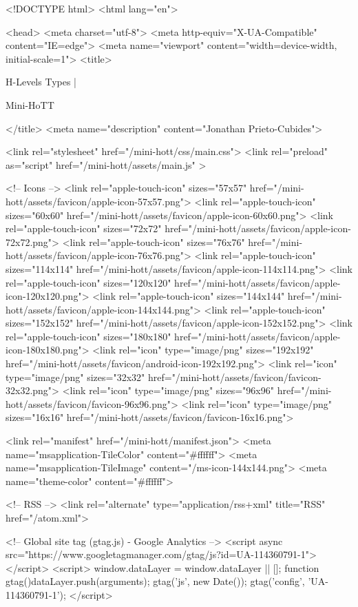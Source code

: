 <!DOCTYPE html>
<html lang="en">

<head>
  <meta charset="utf-8">
  <meta http-equiv="X-UA-Compatible" content="IE=edge">
  <meta name="viewport" content="width=device-width, initial-scale=1">
  <title>
    
      
        H-Levels Types |
      
        Mini-HoTT
    
  </title>
  <meta name="description" content="Jonathan Prieto-Cubides">

  <link rel="stylesheet" href="/mini-hott/css/main.css">
  <link rel="preload" as="script" href="/mini-hott/assets/main.js" >

  <!-- Icons -->
  <link rel="apple-touch-icon" sizes="57x57" href="/mini-hott/assets/favicon/apple-icon-57x57.png">
  <link rel="apple-touch-icon" sizes="60x60" href="/mini-hott/assets/favicon/apple-icon-60x60.png">
  <link rel="apple-touch-icon" sizes="72x72" href="/mini-hott/assets/favicon/apple-icon-72x72.png">
  <link rel="apple-touch-icon" sizes="76x76" href="/mini-hott/assets/favicon/apple-icon-76x76.png">
  <link rel="apple-touch-icon" sizes="114x114" href="/mini-hott/assets/favicon/apple-icon-114x114.png">
  <link rel="apple-touch-icon" sizes="120x120" href="/mini-hott/assets/favicon/apple-icon-120x120.png">
  <link rel="apple-touch-icon" sizes="144x144" href="/mini-hott/assets/favicon/apple-icon-144x144.png">
  <link rel="apple-touch-icon" sizes="152x152" href="/mini-hott/assets/favicon/apple-icon-152x152.png">
  <link rel="apple-touch-icon" sizes="180x180" href="/mini-hott/assets/favicon/apple-icon-180x180.png">
  <link rel="icon" type="image/png" sizes="192x192"  href="/mini-hott/assets/favicon/android-icon-192x192.png">
  <link rel="icon" type="image/png" sizes="32x32" href="/mini-hott/assets/favicon/favicon-32x32.png">
  <link rel="icon" type="image/png" sizes="96x96" href="/mini-hott/assets/favicon/favicon-96x96.png">
  <link rel="icon" type="image/png" sizes="16x16" href="/mini-hott/assets/favicon/favicon-16x16.png">

  <link rel="manifest" href="/mini-hott/manifest.json">
  <meta name="msapplication-TileColor" content="#ffffff">
  <meta name="msapplication-TileImage" content="/ms-icon-144x144.png">
  <meta name="theme-color" content="#ffffff">

  <!-- RSS -->
  <link rel="alternate" type="application/rss+xml" title="RSS" href="/atom.xml">

  <!-- Global site tag (gtag.js) - Google Analytics -->
  <script async src="https://www.googletagmanager.com/gtag/js?id=UA-114360791-1"></script>
  <script>
    window.dataLayer = window.dataLayer || [];
    function gtag(){dataLayer.push(arguments);}
    gtag('js', new Date());
    gtag('config', 'UA-114360791-1');
  </script>

